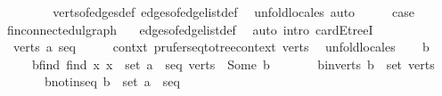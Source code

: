 \begin{isabellebody}
\ \ \ \ \isamarkupfalse%
\ {}\ \isamarkupfalse%
\ verts{\isacharunderscore}{\kern0pt}of{\isacharunderscore}{\kern0pt}edges{\isacharunderscore}{\kern0pt}def\ edges{\isacharunderscore}{\kern0pt}of{\isacharunderscore}{\kern0pt}edge{\isacharunderscore}{\kern0pt}list{\isacharunderscore}{\kern0pt}def\ \isamarkupfalse%
\ {\isacharparenleft}{\kern0pt}unfold{\isacharunderscore}{\kern0pt}locales{\isacharcomma}{\kern0pt}\ auto{\isacharparenright}{\kern0pt}\isanewline
\isanewline
\ \ \isamarkupfalse%
\ \isamarkupfalse%
\ {\isacharquery}{\kern0pt}case\ \isamarkupfalse%
\ fin{\isacharunderscore}{\kern0pt}connected{\isacharunderscore}{\kern0pt}ulgraph\ {}\ \isamarkupfalse%
\ edges{\isacharunderscore}{\kern0pt}of{\isacharunderscore}{\kern0pt}edge{\isacharunderscore}{\kern0pt}list{\isacharunderscore}{\kern0pt}def\ \isamarkupfalse%
\ {\isacharparenleft}{\kern0pt}auto\ intro{\isacharcolon}{\kern0pt}\ card{\isacharunderscore}{\kern0pt}E{\isacharunderscore}{\kern0pt}treeI{\isacharparenright}{\kern0pt}\isanewline
{}\isamarkupfalse%
\isanewline
\ \ \isamarkupfalse%
\ {\isacharparenleft}{\kern0pt}{}\ verts\ a\ seq{\isacharparenright}{\kern0pt}\isanewline
\ \ \isamarkupfalse%
\ \isamarkupfalse%
\ contxt{\isacharcolon}{\kern0pt}\ prufer{\isacharunderscore}{\kern0pt}seq{\isacharunderscore}{\kern0pt}to{\isacharunderscore}{\kern0pt}tree{\isacharunderscore}{\kern0pt}context\ verts\ \isamarkupfalse%
\ unfold{\isacharunderscore}{\kern0pt}locales\isanewline
\ \ \isamarkupfalse%
\ b\isanewline
\ \ \ \ \ b{\isacharunderscore}{\kern0pt}find{\isacharcolon}{\kern0pt}\ {\isachardoublequoteopen}find\ {\isacharparenleft}{\kern0pt}{\isasymlambda}x{\isachardot}{\kern0pt}\ x\ {\isasymnotin}\ set\ {\isacharparenleft}{\kern0pt}a\ {\isacharhash}{\kern0pt}\ seq{\isacharparenright}{\kern0pt}{\isacharparenright}{\kern0pt}\ verts\ {\isacharequal}{\kern0pt}\ Some\ b{\isachardoublequoteclose}\isanewline
\ \ \ \ \ \ \ b{\isacharunderscore}{\kern0pt}in{\isacharunderscore}{\kern0pt}verts{\isacharcolon}{\kern0pt}\ {\isachardoublequoteopen}b\ {\isasymin}\ set\ verts{\isachardoublequoteclose}\isanewline
\ \ \ \ \ \ \ b{\isacharunderscore}{\kern0pt}notin{\isacharunderscore}{\kern0pt}seq{\isacharcolon}{\kern0pt}\ {\isachardoublequoteopen}b\ {\isasymnotin}\ set\ {\isacharparenleft}{\kern0pt}a\ {\isacharhash}{\kern0pt}\ seq{\isacharparenright}{\kern0pt}{\isachardoublequoteclose}\isanewline

\end{isabellebody}
